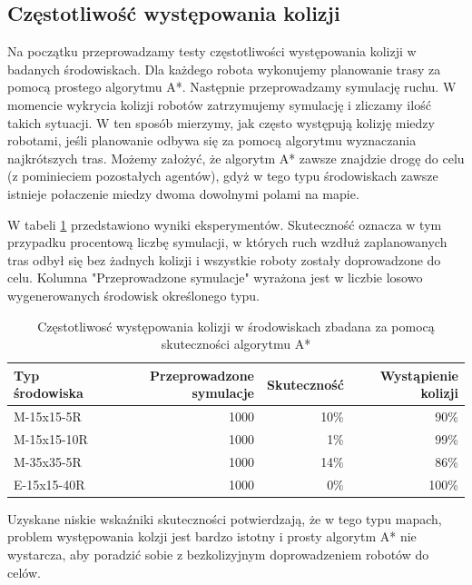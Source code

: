 \subsection{Częstotliwość występowania kolizji}
Na początku przeprowadzamy testy częstotliwości występowania kolizji w badanych środowiskach.
Dla każdego robota wykonujemy planowanie trasy za pomocą prostego algorytmu A*. Następnie przeprowadzamy symulację ruchu. W momencie wykrycia kolizji robotów zatrzymujemy symulację i zliczamy ilość takich sytuacji. W ten sposób mierzymy, jak często występują kolizję miedzy robotami, jeśli planowanie odbywa się za pomocą algorytmu wyznaczania najkrótszych tras.
Możemy założyć, że algorytm A* zawsze znajdzie drogę do celu (z pominieciem pozostałych agentów), gdyż w tego typu środowiskach zawsze istnieje połaczenie miedzy dwoma dowolnymi polami na mapie.

W tabeli \ref{tab:test-collision-frequency} przedstawiono wyniki eksperymentów. Skuteczność oznacza w tym przypadku procentową liczbę symulacji, w których ruch wzdłuż zaplanowanych tras odbył się bez żadnych kolizji i wszystkie roboty zostały doprowadzone do celu.
Kolumna "Przeprowadzone symulacje" wyrażona jest w liczbie losowo wygenerowanych środowisk określonego typu.

\begin{table}
\caption{Częstotliwosć występowania kolizji w środowiskach zbadana za pomocą skuteczności algorytmu A*} \label{tab:test-collision-frequency} 
\centering
\begin{tabular}{| l | r | r | r |}
\hline
{\bf Typ środowiska} & {\bf Przeprowadzone symulacje} & {\bf Skuteczność} & {\bf Wystąpienie kolizji} \\ \hline
M-15x15-5R  & 1000 & 10\% & 90\% \\ \hline
M-15x15-10R & 1000 & 1\%  & 99\%  \\ \hline
M-35x35-5R  & 1000 & 14\% & 86\% \\ \hline
E-15x15-40R & 1000 & 0\%  & 100\%  \\ \hline
\end{tabular}
\end{table}

Uzyskane niskie wskaźniki skuteczności potwierdzają, że w tego typu mapach, problem występowania kolzji jest bardzo istotny i prosty algorytm A* nie wystarcza, aby poradzić sobie z bezkolizyjnym doprowadzeniem robotów do celów.

